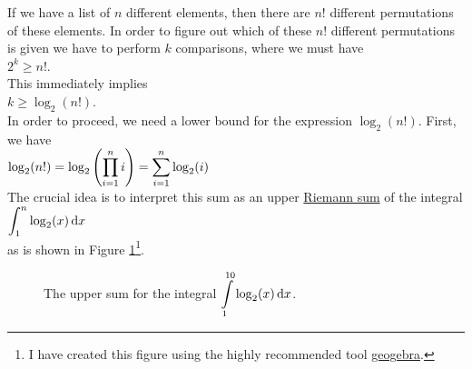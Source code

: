 If we have a list of $n$ different elements, then there are $n!$ different permutations of these
elements.  In order to figure out which of these $n!$ different permutations is given we have to
perform $k$ comparisons, where we must have
\\[0.2cm]
\hspace*{1.3cm}
$2^k \geq n!$.
\\[0.2cm]
This immediately implies
\\[0.2cm]
\hspace*{1.3cm}
$k \geq \log_2(n!)$.
\\[0.2cm]
In order to proceed, we need a lower bound for the expression $\log_2(n!)$.
First, we have
\\[0.2cm]
\hspace*{1.3cm}
$\displaystyle \log_2(n!) = \log_2\left(\prod\limits_{i=1}^n i\right) = \sum\limits_{i=1}^n \log_2(i)$
\\[0.2cm]
The crucial idea is to interpret this sum as an upper \href{https://en.wikipedia.org/wiki/Riemann_sum}{Riemann sum}
of the integral
\\[0.2cm]
\hspace*{1.3cm}
$\displaystyle\int_1^n\log_2(x)\, \mathrm{d}x$
\\[0.2cm]
as is shown in Figure \ref{fig:riemann-sum.pdf}\footnote{
  I have created this figure using the highly recommended tool \href{https://www.geogebra.org/m/h4P4cjsT}{geogebra}.
}.

\begin{figure}[!ht]
  \centering
  \caption{The upper sum for the integral $\displaystyle\int\limits_{1}^{10}\log_2(x) \,\mathrm{d}x$.}
  \label{fig:riemann-sum.pdf}
\end{figure}

